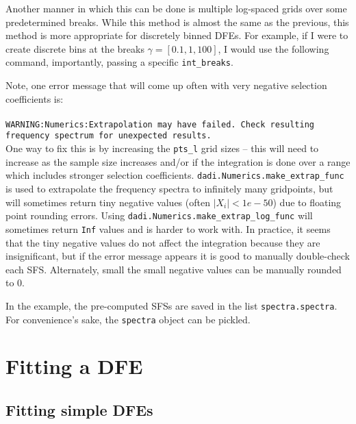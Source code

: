 \documentclass[11pt]{article}
\begin{document}


Another manner in which this can be done is multiple log-spaced grids over some predetermined breaks. While this method is almost the same as the previous, this method is more appropriate for discretely binned DFEs. For example, if I were to create discrete bins at the breaks $\gamma=[0.1, 1, 100]$, I would use the following command, importantly, passing a specific \texttt{int\_breaks}.



Note, one error message that will come up often with very negative selection coefficients is: \\ \\
\texttt{WARNING:Numerics:Extrapolation may have failed. Check resulting frequency spectrum for unexpected results.} \\

One way to fix this is by increasing the \texttt{pts\_l} grid sizes -- this will need to increase as the sample size increases and/or if the integration is done over a range which includes stronger selection coefficients. \texttt{dadi.Numerics.make\_extrap\_func} is used to extrapolate the frequency spectra to infinitely many gridpoints, but will sometimes return tiny negative values (often $|X_i|<1e-50$) due to floating point rounding errors. Using \texttt{dadi.Numerics.make\_extrap\_log\_func} will sometimes return \texttt{Inf} values and is harder to work with. In practice, it seems that the tiny negative values do not affect the integration because they are insignificant, but if the error message appears it is good to manually double-check each SFS. Alternately, small the small negative values can be manually rounded to 0. 

In the example, the pre-computed SFSs are saved in the list \texttt{spectra.spectra}. For convenience's sake, the \texttt{spectra} object can be pickled.



\section{Fitting a DFE}

\subsection{Fitting simple DFEs}
\end{document}

